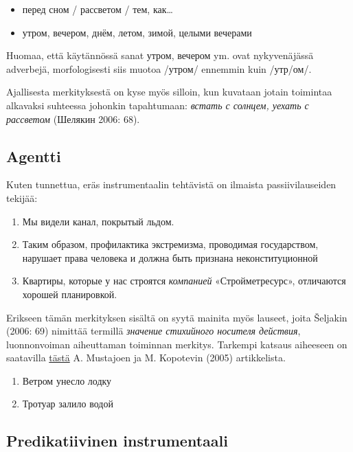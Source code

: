 \documentclass[]{scrreprt}
\providecommand{\tightlist}{%
  \setlength{\itemsep}{0pt}\setlength{\parskip}{0pt}}
\begin{document}
\begin{itemize}
\tightlist
\item
  перед сном / рассветом / тем, как\ldots{}
\item
  утром, вечером, днём, летом, зимой, целыми вечерами
\end{itemize}

Huomaa, että käytännössä sanat утром, вечером ym. ovat nykyvenäjässä
adverbejä, morfologisesti siis muotoa /утром/ ennemmin kuin /утр/ом/.

Ajallisesta merkityksestä on kyse myös silloin, kun kuvataan jotain
toimintaa alkavaksi suhteessa johonkin tapahtumaan: \emph{встать с
солнцем, уехать с рассветом} (Шелякин 2006: 68).

\subsection{Agentti}\label{agentti}

Kuten tunnettua, eräs instrumentaalin tehtävistä on ilmaista
passiivilauseiden tekijää:

\begin{enumerate}
\def\labelenumi{(\arabic{enumi})}
\setcounter{enumi}{135}
\tightlist
\item
  Мы видели канал, покрытый льдом.
\item
  Таким образом, профилактика экстремизма, проводимая государством,
  нарушает права человека и должна быть признана неконституционной
\item
  Квартиры, которые у нас строятся \emph{компанией} «Стройметресурс»,
  отличаются хорошей планировкой.
\end{enumerate}

Erikseen tämän merkityksen sisältä on syytä mainita myös lauseet, joita
Šeljakin (2006: 69) nimittää termillä \emph{значение стихийного носителя
действия}, luonnonvoiman aiheuttaman toiminnan merkitys. Tarkempi
katsaus aiheeseen on saatavilla
\href{http://www.helsinki.fi/~mustajok/pdf/Lodku_uneslo_vetrom.pdf}{tästä}
A. Mustajoen ja M. Kopotevin (2005) artikkelista.

\begin{enumerate}
\def\labelenumi{(\arabic{enumi})}
\setcounter{enumi}{138}
\tightlist
\item
  Ветром унесло лодку
\item
  Тротуар залило водой
\end{enumerate}

\subsection{Predikatiivinen
instrumentaali}\label{predikatiivinen-instrumentaali}
\end{document}
